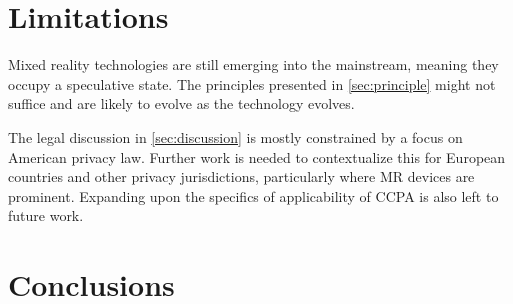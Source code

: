 \documentclass[letterpaper,twocolumn,10pt]{article}
\begin{document}
\section{Limitations}
Mixed reality technologies are still emerging into the mainstream, meaning they occupy a speculative state. The principles presented in \autoref{sec:principle} might not suffice and are likely to evolve as the technology evolves.

The legal discussion in \autoref{sec:discussion} is mostly constrained by a focus on American privacy law. Further work is needed to contextualize this for European countries and other privacy jurisdictions, particularly where MR devices are prominent. Expanding upon the specifics of applicability of CCPA is also left to future work.

\section{Conclusions}


\balance
{}

\end{document}
